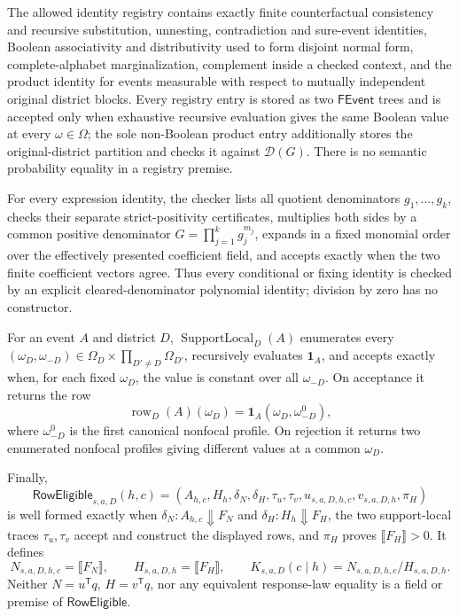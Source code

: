 The allowed identity registry contains exactly finite counterfactual consistency and recursive substitution, unnesting, contradiction and sure-event identities, Boolean associativity and distributivity used to form disjoint normal form, complete-alphabet marginalization, complement inside a checked context, and the product identity for events measurable with respect to mutually independent original district blocks.  Every registry entry is stored as two \(\mathsf{FEvent}\) trees and is accepted only when exhaustive recursive evaluation gives the same Boolean value at every \(\omega\in\Omega\); the sole non-Boolean product entry additionally stores the original-district partition and checks it against \(\mathcal D(G)\).  There is no semantic probability equality in a registry premise.

For every expression identity, the checker lists all quotient denominators \(g_1,\ldots,g_k\), checks their separate strict-positivity certificates, multiplies both sides by a common positive denominator \(G=\prod_{j=1}^kg_j^{m_j}\), expands in a fixed monomial order over the effectively presented coefficient field, and accepts exactly when the two finite coefficient vectors agree.  Thus every conditional or fixing identity is checked by an explicit cleared-denominator polynomial identity; division by zero has no constructor.

For an event \(A\) and district \(D\), \(\operatorname{SupportLocal}_D(A)\) enumerates every \((\omega_D,\omega_{-D})\in\Omega_D\times\prod_{D'\ne D}\Omega_{D'}\), recursively evaluates \(\mathbf1_A\), and accepts exactly when, for each fixed \(\omega_D\), the value is constant over all \(\omega_{-D}\).  On acceptance it returns the row
\[
\operatorname{row}_D(A)(\omega_D)=\mathbf1_A(\omega_D,\omega_{-D}^0),
\]
where \(\omega_{-D}^0\) is the first canonical nonfocal profile.  On rejection it returns two enumerated nonfocal profiles giving different values at a common \(\omega_D\).

Finally,
\[
\mathsf{RowEligible}_{s,a,D}(h,c)
=(A_{h,c},H_h,\delta_N,\delta_H,\tau_u,\tau_v,u_{s,a,D,h,c},v_{s,a,D,h},\pi_H)
\]
is well formed exactly when \(\delta_N:A_{h,c}\Downarrow F_N\) and \(\delta_H:H_h\Downarrow F_H\), the two support-local traces \(\tau_u,\tau_v\) accept and construct the displayed rows, and \(\pi_H\) proves \(\llbracket F_H\rrbracket>0\).  It defines
\[
N_{s,a,D,h,c}=\llbracket F_N\rrbracket,\qquad
H_{s,a,D,h}=\llbracket F_H\rrbracket,\qquad
K_{s,a,D}(c\mid h)=N_{s,a,D,h,c}/H_{s,a,D,h}.
\]
Neither \(N=u^{\mathsf T}q\), \(H=v^{\mathsf T}q\), nor any equivalent response-law equality is a field or premise of \(\mathsf{RowEligible}\).